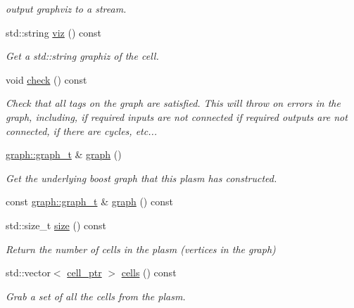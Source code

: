 \begin{DoxyCompactItemize}
\begin{DoxyCompactList}\small\item\em output graphviz to a stream. \end{DoxyCompactList}\item 
std\-::string \hyperlink{structecto_1_1plasm_a4586d90c908123a18dbd3a26c206f63c}{viz} () const 
\begin{DoxyCompactList}\small\item\em Get a std\-::string graphiz of the cell. \end{DoxyCompactList}\item 
void \hyperlink{structecto_1_1plasm_a9554edd5758b8a83ed092a81e249f64a}{check} () const 
\begin{DoxyCompactList}\small\item\em Check that all tags on the graph are satisfied. This will throw on errors in the graph, including, if required inputs are not connected if required outputs are not connected, if there are cycles, etc... \end{DoxyCompactList}\item 
\hyperlink{structecto_1_1graph_1_1graph__t}{graph\-::graph\-\_\-t} \& \hyperlink{structecto_1_1plasm_a4f8de02440afdad0aa395fbaea03399e}{graph} ()
\begin{DoxyCompactList}\small\item\em Get the underlying boost graph that this plasm has constructed. \end{DoxyCompactList}\item 
const \hyperlink{structecto_1_1graph_1_1graph__t}{graph\-::graph\-\_\-t} \& \hyperlink{structecto_1_1plasm_ac6cde6d1d615e85f442ce299fdf0e7a0}{graph} () const 
\item 
std\-::size\-\_\-t \hyperlink{structecto_1_1plasm_aaeeabeb3f78c1a7291eb14e0f705574e}{size} () const 
\begin{DoxyCompactList}\small\item\em Return the number of cells in the plasm (vertices in the graph) \end{DoxyCompactList}\item 
std\-::vector$<$ \hyperlink{namespaceecto_aed1809e82b9229ea81ef9ee3438cf62c}{cell\-\_\-ptr} $>$ \hyperlink{structecto_1_1plasm_aa7724234d631563b10de07030c066e01}{cells} () const 
\begin{DoxyCompactList}\small\item\em Grab a set of all the cells from the plasm. \end{DoxyCompactList}\item 

\end{DoxyCompactItemize}

